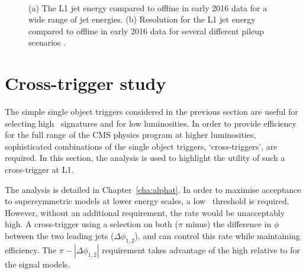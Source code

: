 \begin{figure}
\centering
	~
	\caption{(a) The L1 jet energy compared to offline in early 2016 data for a wide
range of jet energies. (b) Resolution for the L1 jet energy compared to offline in early 2016 data for several different 
pileup scenarios \cite{l1sums_perf}.}
\label{fig:trig_2016}
\end{figure}


\section{Cross-trigger study}
\label{sec:cross_trigger}
The simple single object triggers considered in the previous section are useful for selecting
high \pt~signatures and for low luminosities. In order to provide efficiency for
the full range of the CMS physics program at higher luminosities, sophisticated combinations
of the single object triggers, `cross-triggers', are required. In this section, the \alphat 
analysis is used to highlight the utility of such a cross-trigger at L1. 

The \alphat analysis is detailed in Chapter~\ref{cha:alphat}. In order to maximise acceptance
to supersymmetric models at lower energy scales, a low \scalht~threshold is required. 
However, without an additional requirement, the rate
would be unacceptably high. A cross-trigger using a selection on both ($\pi$ minus) the difference 
in $\phi$ between the two leading jets ($\Delta\phi_{1,2}$), and \scalht can control this rate while 
maintaining efficiency. The $\pi - |\Delta\phi_{1,2}|$ requirement takes advantage of the high relative 
\mht to \scalht for the signal models.

